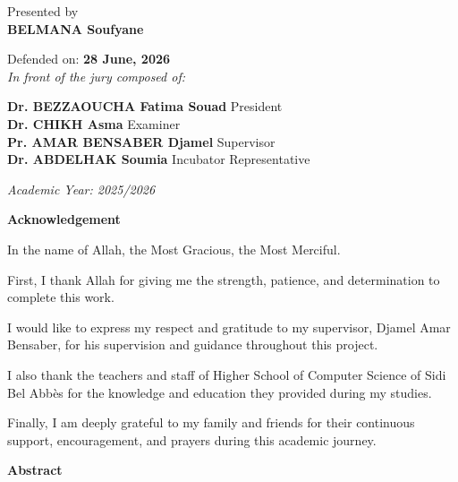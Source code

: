 \documentclass[openany,12pt,oneside]{extreport}
\begin{document}
\begin{titlepage}
\normalsize Presented by\\
{\normalsize \textbf{BELMANA Soufyane}}\\

\vspace{0.2cm}

{\normalsize Defended on: \textbf{28 June, 2026}}\\
{\normalsize \textit{In front of the jury composed of:}}\\
\vspace{0.2cm}
\begin{center}
    {\normalsize \textbf{Dr. BEZZAOUCHA Fatima Souad} \hfill President} \\
    {\normalsize \textbf{Dr. CHIKH Asma} \hfill Examiner} \\
    {\normalsize \textbf{Pr. AMAR BENSABER Djamel} \hfill Supervisor} \\
    {\normalsize \textbf{Dr. ABDELHAK Soumia} \hfill Incubator Representative} \\
\end{center}

\vspace{0.5cm}

\normalsize \textit{Academic Year: 2025/2026}
\end{titlepage}


\newpage
\vspace*{4cm}
\begin{center}
    {\Large \bf Acknowledgement}
\end{center} \vskip 0.5cm \vskip 0.5cm

In the name of Allah, the Most Gracious, the Most Merciful.

First, I thank Allah for giving me the strength, patience, and determination to complete this work.

I would like to express my respect and gratitude to my supervisor, Djamel Amar Bensaber, for his supervision and guidance throughout this project.

I also thank the teachers and staff of Higher School of Computer Science of Sidi Bel Abbès for the knowledge and education they provided during my studies.

Finally, I am deeply grateful to my family and friends for their continuous support, encouragement, and prayers during this academic journey. \vskip 0.5cm

\newpage
\vspace*{3cm}
\begin{center}
    {\Large\bf Abstract}
\end{center} \vskip 1cm
\end{document}

